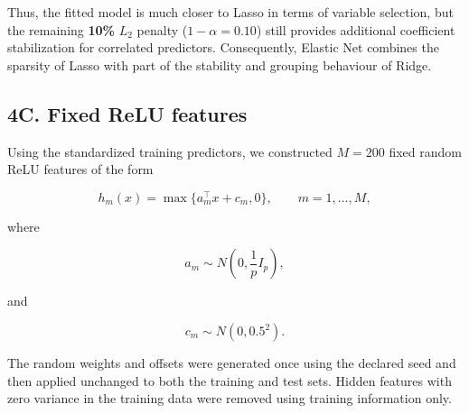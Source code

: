 \documentclass[
  11pt,
]{article}
\begin{document}
Thus, the fitted model is much closer to Lasso in terms of variable
selection, but the remaining \textbf{10\%} \(L_2\) penalty
(\(1-\alpha=0.10\)) still provides additional coefficient stabilization
for correlated predictors. Consequently, Elastic Net combines the
sparsity of Lasso with part of the stability and grouping behaviour of
Ridge.

\subsection{4C. Fixed ReLU features}\label{c.-fixed-relu-features}

Using the standardized training predictors, we constructed \(M = 200\)
fixed random ReLU features of the form

\[h_m(x)=\max\{a_m^\top x+c_m,0\},
\qquad m=1,\ldots,M,\]

where

\[a_m\sim N\left(0,\frac1pI_p\right),\]

and

\[c_m\sim N(0,0.5^2).\]

The random weights and offsets were generated once using the declared
seed and then applied unchanged to both the training and test sets.
Hidden features with zero variance in the training data were removed
using training information only.
\end{document}
